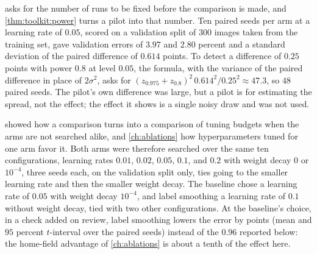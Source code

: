 \begin{refsection}
\begin{experiment}
\end{experiment}


 asks for the number of runs to be fixed before the comparison is made, and \cref{thm:toolkit:power} turns a pilot into that number. Ten paired seeds per arm at a learning rate of $0.05$, scored on a validation split of 300 images taken from the training set, gave validation errors of $3.97$ and $2.80$ percent and a standard deviation of the paired difference of $0.614$ points. To detect a difference of $0.25$ points with power $0.8$ at level $0.05$, the formula, with the variance of the paired difference in place of $2\sigma^2$, asks for $(z_{0.975}+z_{0.8})^2\,0.614^2/0.25^2\approx47.3$, so $48$ paired seeds. The pilot's own difference was large, but a pilot is for estimating the spread, not the effect; the effect it shows is a single noisy draw and was not used.


 showed how a comparison turns into a comparison of tuning budgets when the arms are not searched alike, and \cref{ch:ablations} how hyperparameters tuned for one arm favor it. Both arms were therefore searched over the same ten configurations, learning rates $0.01$, $0.02$, $0.05$, $0.1$, and $0.2$ with weight decay $0$ or $10^{-4}$, three seeds each, on the validation split only, ties going to the smaller learning rate and then the smaller weight decay. The baseline chose a learning rate of $0.05$ with weight decay $10^{-4}$, and label smoothing a learning rate of $0.1$ without weight decay, tied with two other configurations. At the baseline's choice, in a check added on review, label smoothing lowers the error by  points (mean and $95$ percent $t$-interval over the paired seeds) instead of the $0.96$ reported below: the home-field advantage of \cref{ch:ablations} is about a tenth of the effect here.


\end{refsection}
